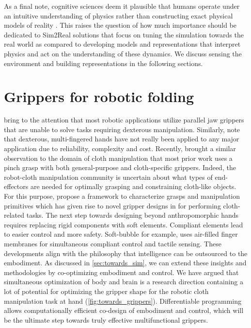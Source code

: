 \documentclass[\home/main.tex]{subfiles}
\begin{document}
As a final note, cognitive sciences deem it plausible that humans operate under an intuitive understanding of physics rather than constructing exact physical models of reality \autocite{Baillargeon2011}. This raises the question of how much importance should be dedicated to Sim2Real solutions that focus on tuning the simulation towards the real world as compared to developing models and representations that interpret physics and act on the understanding of these dynamics. We discuss sensing the environment and building representations in the following sections.

\section{Grippers for robotic folding}
\Textcite{Billard2019} bring to the attention that most robotic applications utilize parallel jaw grippers that are unable to solve tasks requiring dexterous manipulation.
Similarly, \textcite{Siciliano2008} note that dexterous, multi-fingered hands have not really been applied to any major application due to reliability, complexity and cost. Recently, \textcite{Borras2020} brought a similar observation to the domain of cloth manipulation that most prior work uses a pinch grasp with both general-purpose and cloth-specific grippers. Indeed, the robot-cloth manipulation community is uncertain about what types of end-effectors are needed for optimally grasping and constraining cloth-like objects. For this purpose, \citeauthor{Borras2020} propose a framework to characterize grasps and manipulation primitives which has given rise to novel gripper designs in \autocite{Donaire2020} for performing cloth-related tasks.
The next step towards designing beyond anthropomorphic hands requires replacing rigid components with soft elements. Compliant elements lead to easier control and more safety. Soft-bubble \autocite{Naveen2020soft} for example, uses air-filled finger membranes for simultaneous compliant control and tactile sensing.
These developments align with the philosophy that intelligence can be outsourced to the embodiment.
As discussed in \cref{sec:towards_sim}, we can extend these insights and methodologies by co-optimizing embodiment and control. We have argued that simultaneous optimization of body and brain is a research direction containing a lot of potential for optimizing the gripper shape for the robotic cloth manipulation task at hand (\cref{fig:towards_grippers}). Differentiable programming allows computationally efficient co-design of embodiment and control, which will be the ultimate step towards truly effective multifunctional grippers.
\end{document}
